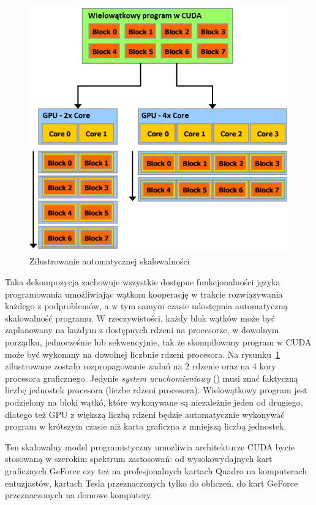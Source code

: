 \begin{figure}
\centering\includegraphics[width=1.0\textwidth]{figures/03/threads_gpu.png}
\caption{Zilustrowanie automatycznej skalowalności~\cite{Cuda:PGuide}}\label{rys:threads_gpu}
\end{figure}

Taka dekompozycja zachowuje wszystkie dostępne funkcjonalności języka programowania umożliwiając wątkom kooperację w trakcie rozwiązywania każdego z podproblemów, a w tym samym czasie udostępnia automatyczną skalowalność programu. W rzeczywistości, każdy blok wątków może być zaplanowany na każdym z dostępnych rdzeni na procesorze, w dowolnym porządku, jednocześnie lub sekwencyjnie, tak że skompilowany program w CUDA może być wykonany na dowolnej liczbnie rdzeni procesora. Na rysunku~\ref{rys:threads_gpu} zilustrowane zostało rozpropagowanie zadań na 2 rdzenie oraz na 4 kory procesora graficznego. Jedynie \emph{system uruchomieniowy} () musi znać faktyczną liczbę jednostek procesora (liczbe rdzeni procesora). Wielowątkowy program jest podzielony na bloki wątkó, które wykonywane są niezależnie jeden od drugiego, dlatego też GPU z większą liczbą rdzeni będzie automatycznie wykonywać program w krótszym czasie niż karta graficzna z mniejszą liczbą jednostek.


Ten skalowalny model programistyczny umożliwia architekturze CUDA bycie stosowaną w szerokim spektrum zastosowań: od wysokowydajnych kart graficznych GeForce czy też na profesjonalnych kartach Quadro na komputerach entuzjastów, kartach Tesla przeznaczonych tylko do obliczeń, do kart GeForce przeznaczonych na domowe komputery.

